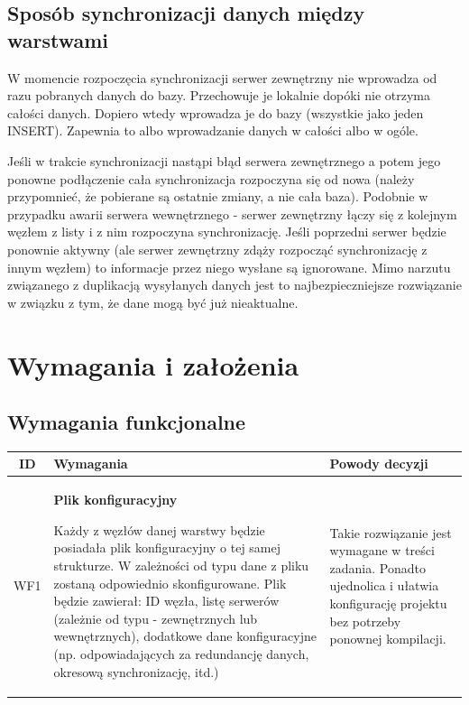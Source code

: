 {\subsection[Sposób synchronizacji danych między warstwami]{Sposób synchronizacji danych między warstwami}

\par{W momencie rozpoczęcia synchronizacji serwer zewnętrzny nie wprowadza od razu pobranych danych do bazy. Przechowuje je lokalnie dopóki nie otrzyma całości danych. Dopiero wtedy wprowadza je do bazy (wszystkie jako jeden INSERT). Zapewnia to albo wprowadzanie danych w całości albo w ogóle.}

\par{Jeśli w trakcie synchronizacji nastąpi błąd serwera zewnętrznego a potem jego ponowne podłączenie cała synchronizacja rozpoczyna się od nowa (należy przypomnieć, że pobierane są ostatnie zmiany, a nie cała baza). Podobnie w przypadku awarii serwera wewnętrznego - serwer zewnętrzny łączy się z kolejnym węzłem z listy i z nim rozpoczyna synchronizację. Jeśli poprzedni serwer będzie ponownie aktywny (ale serwer zewnętrzny zdąży rozpocząć synchronizację z innym węzłem) to informacje przez niego wysłane są ignorowane. Mimo narzutu związanego z duplikacją wysyłanych danych jest to najbezpieczniejsze rozwiązanie w związku z tym, że dane mogą być już nieaktualne.}

\section[Wymagania i założenia]{Wymagania i założenia}

\subsection[Wymagania funkcjonalne]{Wymagania funkcjonalne}

\begin{tabularx}{\textwidth}{|c|X|X|}
\hline
\textbf{ID} & \textbf{Wymagania}  & \textbf{Powody decyzji} \\
\hline

\label{z:WF1} WF1 & \textbf{Plik konfiguracyjny}


Każdy z węzłów danej warstwy będzie posiadała plik konfiguracyjny o tej samej strukturze. W zależności od typu dane z pliku zostaną odpowiednio skonfigurowane. Plik będzie zawierał: ID węzła, listę serwerów (zależnie od typu - zewnętrznych lub wewnętrznych), dodatkowe dane konfiguracyjne (np. odpowiadających za redundancję danych, okresową synchronizację, itd.) &
Takie rozwiązanie jest wymagane w treści zadania. Ponadto ujednolica i ułatwia konfigurację projektu bez potrzeby ponownej kompilacji.\\
\hline


\end{tabularx}}
